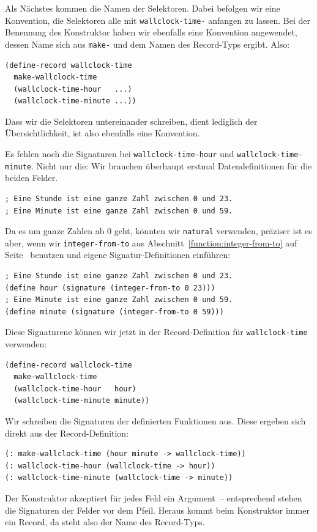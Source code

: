 \mantraschreib*

\noindent Als Nächstes kommen die Namen der Selektoren.  Dabei befolgen wir eine
Konvention, die Selektoren alle mit \lstinline{wallclock-time-} anfangen
zu lassen.  Bei der Benennung des Konstruktor haben wir ebenfalls
eine Konvention angewendet, dessen Name sich aus \lstinline{make-} und
dem Namen des Record-Typs ergibt.  Also:
%
\begin{lstlisting}
(define-record wallclock-time
  make-wallclock-time
  (wallclock-time-hour   ...)
  (wallclock-time-minute ...))
\end{lstlisting}
%
Dass wir die Selektoren untereinander schreiben, dient lediglich der
Übersichtlichkeit, ist also ebenfalls eine Konvention.

Es fehlen noch
die Signaturen bei \lstinline{wallclock-time-hour} und
\lstinline{wallclock-time-minute}.  Nicht nur die: Wir brauchen
überhaupt erstmal Datendefinitionen für die beiden Felder.
%
\begin{lstlisting}
; Eine Stunde ist eine ganze Zahl zwischen 0 und 23.
; Eine Minute ist eine ganze Zahl zwischen 0 und 59.
\end{lstlisting}
%
Da es um ganze Zahlen ab 0 geht, könnten wir \lstinline{natural}
verwenden, präziser ist es aber, wenn wir \lstinline{integer-from-to}
aus Abschnitt~\ref{function:integer-from-to} auf
Seite~\pageref{function:integer-from-to} benutzen und eigene
Signatur-Definitionen einführen:
%
\begin{lstlisting}
; Eine Stunde ist eine ganze Zahl zwischen 0 und 23.
(define hour (signature (integer-from-to 0 23)))
; Eine Minute ist eine ganze Zahl zwischen 0 und 59.
(define minute (signature (integer-from-to 0 59)))
\end{lstlisting}
%
Diese Signaturene können wir jetzt in der Record-Definition für
\lstinline{wallclock-time} verwenden:
%
\begin{lstlisting}
(define-record wallclock-time
  make-wallclock-time
  (wallclock-time-hour   hour)
  (wallclock-time-minute minute))
\end{lstlisting}
%
Wir schreiben die Signaturen der definierten Funktionen aus.  Diese
ergeben sich direkt aus der Record-Definition:
%
\begin{lstlisting}
(: make-wallclock-time (hour minute -> wallclock-time))
(: wallclock-time-hour (wallclock-time -> hour))
(: wallclock-time-minute (wallclock-time -> minute))
\end{lstlisting}
%
Der Konstruktor akzeptiert für jedes Feld ein Argument~-- entsprechend
stehen die Signaturen der Felder vor dem Pfeil.  Heraus kommt beim
Konstruktor immer ein Record, da steht also der Name des Record-Typs.


